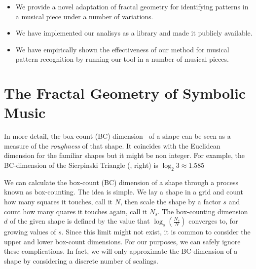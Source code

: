 \begin{itemize}
  \item We provide a novel adaptation of fractal geometry for identifying patterns
        in a musical piece under a number of variations.
  \item We have implemented our analisys as a library and made it publicly available.
  \item We have empirically shown the effectiveness of our method for musical pattern
        recognition by running our tool in a number of musical pieces.
\end{itemize}

\section{The Fractal Geometry of Symbolic Music}
\label{sec:fractal-geom}



 In more detail, the box-count (BC) dimension~\cite{bouligand1928ensembles} of a shape
can be seen as a measure of the \emph{roughness} of that shape. It coincides with the
Euclidean dimension for the familiar shapes but it might be non integer. For example,
the BC-dimension of the Sierpinski Triangle (, right) is $\log_2 3 \approx 1.585$

  We can calculate the box-count (BC) dimension of a shape through a
process known as box-counting. The idea is simple. We lay a shape in a
grid and count how many squares it touches, call it $N$, then scale
the shape by a factor $s$ and count how many quares it touches again,
call it $N_s$. The box-counting dimension $d$ of the given shape is
defined by the value that $\log_s(\frac{N_s}{N})$ converges to, for
growing values of $s$.  Since this limit might not exist, it is common
to consider the upper and lower box-count dimensions.  For our
purposes, we can safely ignore these complications. In fact, we will
only approximate the BC-dimension of a shape by considering a discrete
number of scalings. 

